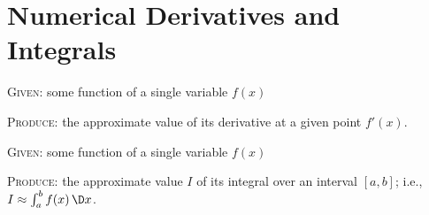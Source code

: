 \chapter{Numerical Derivatives and Integrals}


\begin{problem}
  \textsc{Given:} some function of a single variable $f(x)$

  \textsc{Produce:} the approximate value of its derivative at a given
  point $f'(x)$.
\end{problem}

\begin{problem}[Quadrature]
  \textsc{Given:} some function of a single variable $f(x)$

  \textsc{Produce:} the approximate value $I$ of its integral over an
  interval $[a,b]$; i.e., $I\approx\int^{b}_{a}f(x)\,\D x$.
\end{problem}

